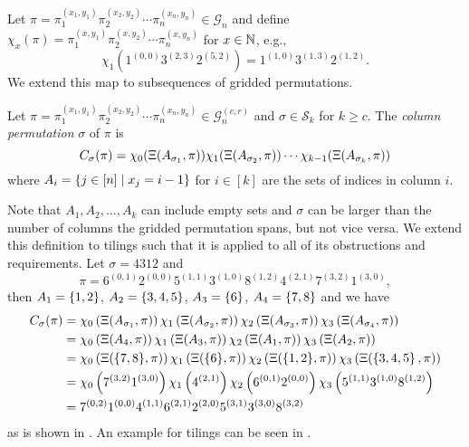 Let $\pi=\pi_1^{(x_1,y_1)}\pi_2^{(x_2,y_2)}\dotsm\pi_n^{(x_n,y_n)} \in \mathcal{G}_n$ and define $\chi_x(\pi) = \pi_1^{(x,y_1)}\pi_2^{(x,y_2)}\dotsm\pi_n^{(x,y_n)}$ for $x\in\mathbb{N}$, e.g.,
\[
\chi_{1}\left(1^{(0,0)}3^{(2,3)}2^{(5,2)}\right) = 1^{(1,0)}3^{(1,3)}2^{(1,2)}.
\]
We extend this map to subsequences of gridded permutations.

\begin{definition}
Let $\pi = \pi_1^{(x_1,y_1)}\pi_2^{(x_2,y_2)}\dotsm\pi_n^{(x_n,y_n)} \in \mathcal{G}_n^{(c,r)}$ and $\sigma \in \mathcal{S}_k$ for $k \geq c$. The \emph{column permutation} $\sigma$ of $\pi$ is 
\[
    C_\sigma(\pi) = \chi_0(\Xi(A_{\sigma_1},\pi))\chi_1(\Xi(A_{\sigma_2},\pi)) \dotsm \chi_{k-1}(\Xi(A_{\sigma_k},\pi))
\]
where $A_i = \left\{j \in [n] \mid x_j = i - 1\right\}$ for $i \in [k]$ are the sets of indices in column $i$.
\end{definition}

Note that $A_1,A_2,\dotsc,A_k$ can include empty sets and $\sigma$ can be larger than the number of columns the gridded permutation spans, but not vice versa. We extend this definition to tilings such that it is applied to all of its obstructions and requirements. Let $\sigma = 4312$ and
\[
\pi = 6^{(0,1)}2^{(0,0)}5^{(1,1)}3^{(1,0)}8^{(1,2)}4^{(2,1)}7^{(3,2)}1^{(3,0)},
\]
then $A_1=\left\{1,2\right\}$, $A_2=\left\{3,4,5\right\}$, $A_3=\left\{6\right\}$, $A_4=\left\{7,8\right\}$ and we have
\begin{align*}
    C_\sigma(\pi) &= \chi_0\left(\Xi(A_{\sigma_1},\pi)\right)\chi_1\left(\Xi(A_{\sigma_2},\pi)\right)\chi_2\left(\Xi(A_{\sigma_3},\pi)\right) \chi_3\left(\Xi(A_{\sigma_{4}},\pi)\right) \\
    &= \chi_0\left(\Xi(A_{4},\pi)\right)\chi_1\left(\Xi(A_{3},\pi)\right)\chi_2\left(\Xi(A_{1},\pi)\right)\chi_3\left(\Xi(A_{2},\pi)\right) \\
    &= \chi_0\left(\Xi({\left\{7,8\right\}},\pi)\right) \chi_1\left(\Xi({\left\{6\right\}},\pi)\right)\chi_2\left(\Xi({\left\{1,2\right\}},\pi)\right)\chi_3\left(\Xi(\left\{3,4,5\right\},\pi)\right) \\
    &= \chi_0\left(7^{(3,2)}1^{(3,0)}\right)\chi_1\left(4^{(2,1)}\right)\chi_2\left(6^{(0,1)}2^{(0,0)}\right)\chi_3\left(5^{(1,1)}3^{(1,0)}8^{(1,2)}\right) \\
    &= 7^{(0,2)}1^{(0,0)}4^{(1,1)}6^{(2,1)}2^{(2,0)}5^{(3,1)}3^{(3,0)}8^{(3,2)}
\end{align*}
as is shown in . An example for tilings can be seen in .

